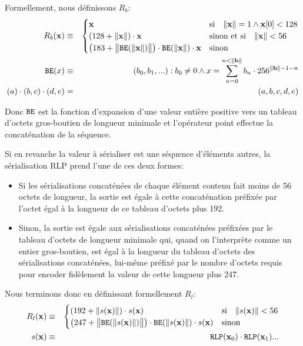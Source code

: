 \documentclass[9pt,oneside]{amsart}
\begin{document}
Formellement, nous définissons $R_b$:
\begin{eqnarray}
R_b(\mathbf{x}) & \equiv & \begin{cases}
\mathbf{x} & \text{si} \quad \lVert \mathbf{x} \rVert = 1 \wedge \mathbf{x}[0] < 128 \\
(128 + \lVert \mathbf{x} \rVert) \cdot \mathbf{x} & \text{sinon et si} \quad \lVert \mathbf{x} \rVert < 56 \\
\big(183 + \big\lVert \mathtt{\tiny BE}(\lVert \mathbf{x} \rVert) \big\rVert \big) \cdot \mathtt{\tiny BE}(\lVert \mathbf{x} \rVert) \cdot \mathbf{x} & \text{sinon}
\end{cases} \\
\mathtt{\tiny BE}(x) & \equiv & (b_0, b_1, ...): b_0 \neq 0 \wedge x = \sum_{n = 0}^{n < \lVert \mathbf{b} \rVert} b_n \cdot 256^{\lVert \mathbf{b} \rVert - 1 - n} \\
(a) \cdot (b, c) \cdot (d, e) & = & (a, b, c, d, e)
\end{eqnarray}

Donc $\mathtt{\tiny BE}$ est la fonction d'expansion d'une valeur entière positive vers un tableau d'octets gros-boutien de longueur minimale et l'opérateur point effectue la concaténation de la séquence.

Si en revanche la valeur à sérialiser est une séquence d'éléments autres, la sérialisation RLP prend l'une de ces deux formes:

\begin{itemize}
\item
  Si les sérialisations concaténées de chaque élément contenu fait moins de 56 octets de longueur, la sortie est égale à cette concaténation préfixée par l'octet égal à la longueur de ce tableau d'octets plus 192.
\item
  Sinon, la sortie est égale aux sérialisations concaténées préfixées par le tableau d'octets de longueur minimale qui, quand on l'interprète comme un entier gros-boutien, est égal à la longueur du tableau d'octets des sérialisations concaténées, lui-même préfixé par le nombre d'octets requis pour encoder fidèlement la valeur de cette longueur plus 247.
\end{itemize}

Nous terminons donc en définissant formellement $R_l$:
\begin{eqnarray}
R_l(\mathbf{x}) & \equiv & \begin{cases}
(192 + \lVert s(\mathbf{x}) \rVert) \cdot s(\mathbf{x}) & \text{si} \quad \lVert s(\mathbf{x}) \rVert < 56 \\
\big(247 + \big\lVert \mathtt{\tiny BE}(\lVert s(\mathbf{x}) \rVert) \big\rVert \big) \cdot \mathtt{\tiny BE}(\lVert s(\mathbf{x}) \rVert) \cdot s(\mathbf{x}) & \text{sinon}
\end{cases} \\
s(\mathbf{x}) & \equiv & \mathtt{\tiny RLP}(\mathbf{x}_0) \cdot \mathtt{\tiny RLP}(\mathbf{x}_1) ...
\end{eqnarray}
\end{document}
